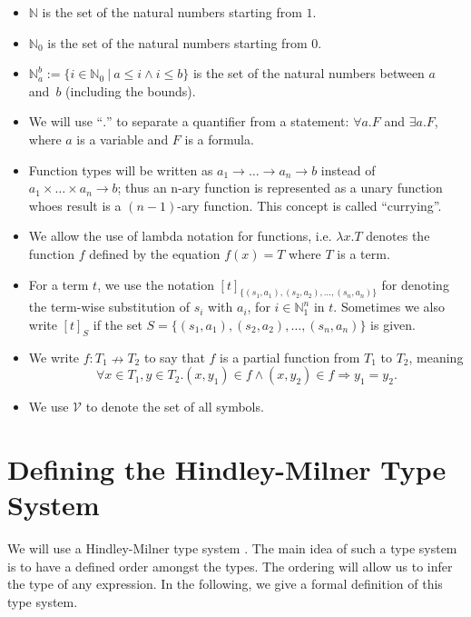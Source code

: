 \documentclass[]{scrbook}
\providecommand{\tightlist}{%
  \setlength{\itemsep}{0pt}\setlength{\parskip}{0pt}}
\theoremstyle{definition}
\theoremstyle{definition}
\theoremstyle{definition}
\theoremstyle{remark}
\begin{document}
\begin{itemize}
\tightlist
\item
  \(\mathbb{N}\) is the set of the natural numbers starting from \(1\).
\item
  \(\mathbb{N}_0\) is the set of the natural numbers starting from
  \(0\).
\item
  \(\mathbb{N}_a^b:=\{i\in \mathbb{N}_0 \ | \ a \leq i \land i \leq b\}\)
  is the set of the natural numbers between \(a\) and~\(b\) (including
  the bounds).
\item
  We will use \enquote{\(.\)} to separate a quantifier from a statement:
  \(\forall a . F\) and \(\exists a . F\), where \(a\) is a variable and
  \(F\) is a formula.
\item
  Function types will be written as \(a_1 \to \dots \to a_n \to b\)
  instead of \(a_1 \times \dots \times a_n \to b\); thus an n-ary
  function is represented as a unary function whoes result is a
  \((n-1)\)-ary function. This concept is called \enquote{currying}.
\item
  We allow the use of lambda notation for functions, i.e.
  \(\lambda x.T\) denotes the function \(f\) defined by the equation
  \(f(x) = T\) where \(T\) is a term.
\item
  For a term \(t\), we use the notation
  \([t]_{\{(s_1,a_1),(s_2,a_2),\dots,(s_n,a_n)\}}\) for denoting the
  term-wise substitution of \(s_i\) with \(a_i\), for
  \(i\in\mathbb{N}_1^n\) in \(t\). Sometimes we also write \([t]_S\) if
  the set \(S = \{(s_1,a_1),(s_2,a_2),\dots,(s_n,a_n)\}\) is given.
\item
  We write \(f : T_1 \nrightarrow T_2\) to say that \(f\) is a partial
  function from \(T_1\) to \(T_2\), meaning
  \[\forall x\in T_1,y\in T_2.(x,y_1)\in f \land (x,y_2)\in f \Rightarrow y_1 = y_2.\]
\item
  We use \(\mathcal{V}\) to denote the set of all symbols.
\end{itemize}

\section{Defining the Hindley-Milner Type
System}\label{defining-the-hindley-milner-type-system}

We will use a Hindley-Milner type system
\autocite{Principal_Type-Schemes_for_Functional_Programs}. The main idea
of such a type system is to have a defined order amongst the types. The
ordering will allow us to infer the type of any expression. In the
following, we give a formal definition of this type system.
\end{document}
